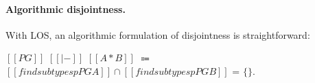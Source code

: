 \paragraph*{Algorithmic disjointness.}
With LOS, an algorithmic formulation of
disjointness is straightforward:

\begin{definition}
\label{def:inter:ad}
  $[[PG]]$ $[[|-]]$ $[[A * B]]$ $\Coloneqq$  $ [[findsubtypesp PG A]] \cap [[findsubtypesp PG B]] $ = $\{\}$.
\end{definition}

